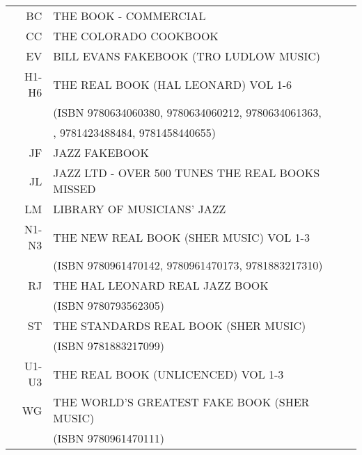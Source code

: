 \documentclass[8pt]{scrartcl}
\begin{document}
\selectfont
\begin{center}
  \begin{tabular}{rl}%
    BC    &  THE BOOK - COMMERCIAL\\
    CC    &  THE COLORADO COOKBOOK\\
    EV    &  BILL EVANS FAKEBOOK (TRO LUDLOW MUSIC)\\
    H1-H6 &  THE REAL BOOK (HAL LEONARD) VOL 1-6\\
          &  \quad(ISBN 9780634060380, 9780634060212, 9780634061363, \\
          &  \quad9781423425427, 9781423488484, 9781458440655) \\
    JF    &  JAZZ FAKEBOOK\\
    JL    &  JAZZ LTD - OVER 500 TUNES THE REAL BOOKS MISSED\\
    LM    &  LIBRARY OF MUSICIANS’ JAZZ\\
    N1-N3 &  THE NEW REAL BOOK (SHER MUSIC) VOL 1-3\\
          &  \quad(ISBN 9780961470142, 9780961470173, 9781883217310)\\
    RJ    &  THE HAL LEONARD REAL JAZZ BOOK\\
          &  \quad(ISBN 9780793562305)\\
    ST    &  THE STANDARDS REAL BOOK (SHER MUSIC)\\
          &  \quad(ISBN 9781883217099)\\
    U1-U3 &  THE REAL BOOK (UNLICENCED) VOL 1-3\\
    WG    &  THE WORLD'S GREATEST FAKE BOOK (SHER MUSIC)\\
          &  \quad(ISBN 9780961470111)\\
  \end{tabular}
\end{center}

\begin{multicols}{3}
  \raggedright
  
\end{multicols}
\end{document}
